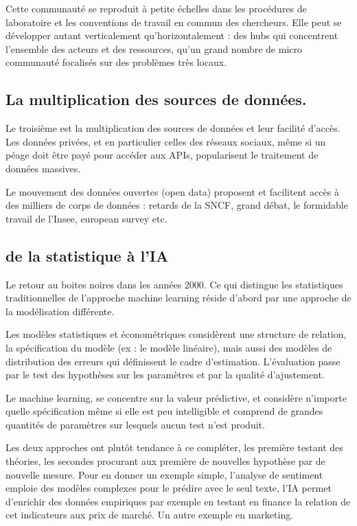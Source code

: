 \documentclass[
]{book}
\begin{document}
Cette communauté se reproduit à petite échelles dans les procédures de laboratoire et les conventions de travail en commun des chercheurs. Elle peut se développer autant verticalement qu'horizontalement : des hubs qui concentrent l'ensemble des acteurs et des ressources, qu'un grand nombre de micro communauté focalisés sur des problèmes très locaux.

\hypertarget{la-multiplication-des-sources-de-donnuxe9es.}{%
\subsection{La multiplication des sources de données.}\label{la-multiplication-des-sources-de-donnuxe9es.}}

Le troisième est la multiplication des sources de données et leur facilité d'accès. Les données privées, et en particulier celles des réseaux sociaux, même si un péage doit être payé pour accéder aux APIs, popularisent le traitement de données massives.

Le mouvement des données ouvertes (open data) proposent et facilitent accès à des milliers de corps de données : retards de la SNCF, grand débat, le formidable travail de l'Insee, european survey etc.

\hypertarget{de-la-statistique-uxe0-lia}{%
\subsection{de la statistique à l'IA}\label{de-la-statistique-uxe0-lia}}

Le retour au boites noires dans les années 2000. Ce qui distingue les statistiques traditionnelles de l'approche machine learning réside d'abord par une approche de la modélisation différente.

Les modèles statistiques et économétriques considèrent une structure de relation, la spécification du modèle (ex : le modèle linéaire), mais aussi des modèles de distribution des erreurs qui définissent le cadre d'estimation. L'évaluation passe par le test des hypothèses sur les paramètres et par la qualité d'ajustement.

Le machine learning, se concentre sur la valeur prédictive, et considère n'importe quelle spécification même si elle est peu intelligible et comprend de grandes quantités de paramètres sur lesquels aucun test n'est produit.

Les deux approches ont plutôt tendance à ce compléter, les première testant des théories, les secondes procurant aux première de nouvelles hypothèse par de nouvelle mesure. Pour en donner un exemple simple, l'analyse de sentiment emploie des modèles complexes pour le prédire avec le seul texte, l'IA permet d'enrichir des données empiriques par exemple en testant en finance la relation de cet indicateurs aux prix de marché. Un autre exemple en marketing.
\end{document}
